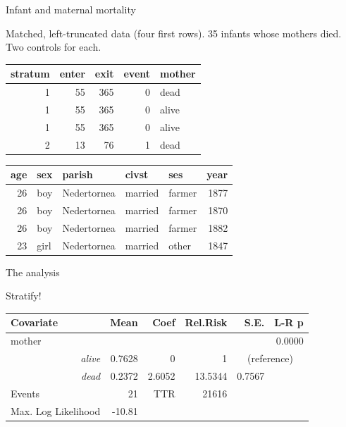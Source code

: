 \begin{frame}{Infant and maternal mortality}

Matched, left-truncated data (four first rows). 35 infants whose mothers
died. Two controls for each.

\begin{longtable}[c]{@{}rrrrl@{}}
\toprule
stratum & enter & exit & event & mother\tabularnewline
\midrule
\endhead
1 & 55 & 365 & 0 & dead\tabularnewline
1 & 55 & 365 & 0 & alive\tabularnewline
1 & 55 & 365 & 0 & alive\tabularnewline
2 & 13 & 76 & 1 & dead\tabularnewline
\bottomrule
\end{longtable}

\begin{longtable}[c]{@{}rllllr@{}}
\toprule
age & sex & parish & civst & ses & year\tabularnewline
\midrule
\endhead
26 & boy & Nedertornea & married & farmer & 1877\tabularnewline
26 & boy & Nedertornea & married & farmer & 1870\tabularnewline
26 & boy & Nedertornea & married & farmer & 1882\tabularnewline
23 & girl & Nedertornea & married & other & 1847\tabularnewline
\bottomrule
\end{longtable}

\end{frame}

\begin{frame}[fragile]{The analysis}

Stratify!

\begin{Shaded}
\begin{Highlighting}[]
\StringTok{ }\NormalTok{(}\StringTok{ }\StringTok{ }
\StringTok{                  } 
\StringTok{ } \NormalTok{)}
 \NormalTok{)}
\end{Highlighting}
\end{Shaded}

\begin{table}[ht] 
\begin{center} 
\begin{tabular}{lrrrrr} 
\hline 
Covariate & Mean & Coef & Rel.Risk & S.E. &   L-R p \\ \hline
mother  & & & & & 0.0000  \\ 
\multicolumn{1}{r}{\em alive} &   0.7628 & 0 & 1 & \multicolumn{2}{c}{(reference)} \\ 
\multicolumn{1}{r}{ \em dead }  &    0.2372  &  2.6052  &  13.5344  &  0.7567\\ 
\hline 
Events &  21  & TTR &  21616 \\ 
Max. Log Likelihood &  -10.81 \\ \hline 
\hline 
\end{tabular}
\end{center} 
\end{table}

\end{frame}

